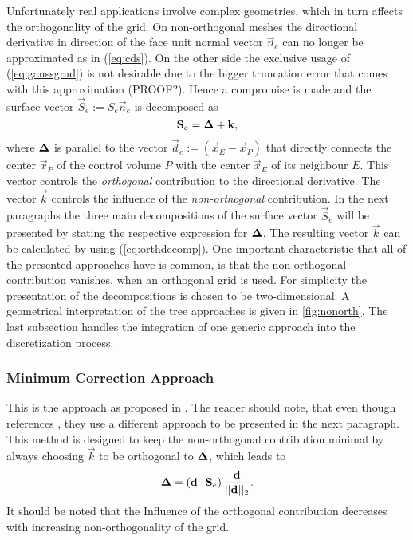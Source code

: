     Unfortunately real applications involve complex geometries, which in turn affects the orthogonality of the grid. On non-orthogonal meshes the directional derivative in direction of the face unit normal vector \(\vec{n}_e\) can no longer be approximated as in (\ref{eq:cds}). On the other side the exclusive usage of (\ref{eq:gaussgrad}) is not desirable due to the bigger truncation error that comes with this approximation (PROOF?). Hence a compromise is made and the surface vector \(\vec{S}_e := S_e \vec{n}_e\) is decomposed as
    \begin{equation}
      \label{eq:orthdecomp}
      \mathbf{S}_e = \boldsymbol{\Delta} + \mathbf{k},
    \end{equation}
    where \(\boldsymbol{\Delta}\) is parallel to the vector \(\vec{d}_e := \left(\vec{x}_E - \vec{x}_P\right)\) that directly connects the center \(\vec{x}_P\) of the control volume \(P\) with the center \(\vec{x}_E\) of its neighbour \(E\). This vector controls the \emph{orthogonal} contribution to the directional derivative. The vector \(\vec{k}\) controls the influence of the \emph{non-orthogonal} contribution. In the next paragraphs the three main decompositions of the surface vector \(\vec{S}_e\) will be presented by stating the respective expression for \(\boldsymbol{\Delta}\). The resulting vector \(\vec{k}\) can be calculated by using (\ref{eq:orthdecomp}). One important characteristic that all of the presented approaches have is common, is that the non-orthogonal contribution vanishes, when an orthogonal grid is used. For simplicity the presentation of the decompositions is chosen to be two-dimensional. A geometrical interpretation of the tree approaches is given in \ref{fig:nonorth}. The last subsection handles the integration of one generic approach into the discretization process.

      \subsubsection{Minimum Correction Approach}

      This is the approach as proposed in \cite{muzaferja}. The reader should note, that even though \cite{ferziger02} references \cite{muzaferja}, they use a different approach to be presented in the next paragraph. This method is designed to keep the non-orthogonal contribution minimal by always choosing \(\vec{k}\) to be orthogonal to \(\boldsymbol{\Delta}\), which leads to
      \begin{displaymath}
        \boldsymbol{\Delta} = \left( \mathbf{d} \cdot \mathbf{S}_e \right) \frac{\mathbf{d}}{||\mathbf{d}||_2}.
      \end{displaymath}
      It should be noted that the Influence of the orthogonal contribution decreases with increasing non-orthogonality of the grid.

